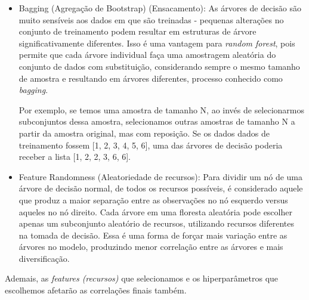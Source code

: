 \documentclass{article}
\begin{document}
\begin{itemize}
    \item Bagging (Agregação de Bootstrap) (Ensacamento): As árvores de decisão são muito sensíveis aos dados em que são treinadas - pequenas alterações no conjunto de treinamento podem resultar em estruturas de árvore significativamente diferentes. Isso é uma vantagem para \textit{random forest}, pois permite que cada árvore individual faça uma amostragem aleatória do conjunto de dados com substituição, considerando sempre o mesmo tamanho de amostra e resultando em árvores diferentes, processo conhecido como \textit{bagging}.
    
    Por exemplo, se temos uma amostra de tamanho N, ao invés de selecionarmos subconjuntos dessa amostra, selecionamos outras amostras de tamanho N a partir da amostra original, mas com reposição. Se os dados dados de treinamento fossem [1, 2, 3, 4, 5, 6], uma das árvores de decisão poderia receber a lista [1, 2, 2, 3, 6, 6].
    
    \item Feature Randomness (Aleatoriedade de recursos): Para dividir um nó de uma árvore de decisão normal, de todos os recursos possíveis, é considerado aquele que produz a maior separação entre as observações no nó esquerdo versus aqueles no nó direito. Cada árvore em uma floresta aleatória pode escolher apenas um subconjunto aleatório de recursos, utilizando recursos diferentes na tomada de decisão. Essa é uma forma de forçar mais variação entre as árvores no modelo, produzindo menor correlação entre as árvores e mais diversificação.
\end{itemize}

Ademais, as \textit{features (recursos)} que selecionamos e os hiperparâmetros que escolhemos afetarão as correlações finais também.
\end{document}
